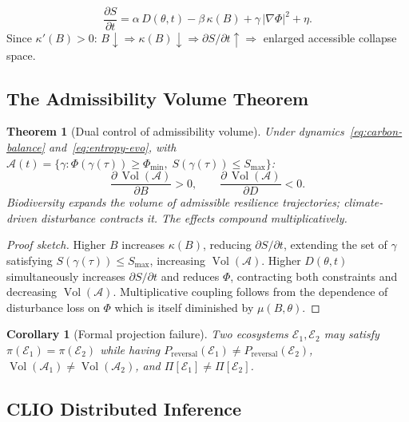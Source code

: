 \documentclass[12pt]{article}
\newtheorem{theorem}{Theorem}
\newtheorem{corollary}{Corollary}
\newcommand{\Ecal}{\mathcal{E}}
\newcommand{\Acal}{\mathcal{A}}
\newcommand{\vol}{\operatorname{Vol}}
\begin{document}
\begin{equation}
\label{eq:entropy-evo}
\frac{\partial S}{\partial t}
= \alpha\,D(\theta,t)
- \beta\,\kappa(B)
+ \gamma\,|\nabla\Phi|^2
+ \eta.
\end{equation}
Since $\kappa'(B)>0$: $B\downarrow \Rightarrow \kappa(B)\downarrow \Rightarrow
\partial S/\partial t\uparrow \Rightarrow$ enlarged accessible collapse space.

\subsection{The Admissibility Volume Theorem}

\begin{theorem}[Dual control of admissibility volume]
Under dynamics~\eqref{eq:carbon-balance} and~\eqref{eq:entropy-evo}, with
$\Acal(t)=\{\gamma:\Phi(\gamma(\tau))\geq\Phi_{\min},\;S(\gamma(\tau))\leq S_{\max}\}$:
\begin{equation}
\frac{\partial\,\vol(\Acal)}{\partial B}>0,
\qquad
\frac{\partial\,\vol(\Acal)}{\partial D}<0.
\end{equation}
Biodiversity expands the volume of admissible resilience trajectories; climate-driven
disturbance contracts it. The effects compound multiplicatively.
\end{theorem}

\begin{proof}[Proof sketch]
Higher $B$ increases $\kappa(B)$, reducing $\partial S/\partial t$, extending the set
of $\gamma$ satisfying $S(\gamma(\tau))\leq S_{\max}$, increasing $\vol(\Acal)$.
Higher $D(\theta,t)$ simultaneously increases $\partial S/\partial t$ and reduces $\Phi$,
contracting both constraints and decreasing $\vol(\Acal)$. Multiplicative coupling
follows from the dependence of disturbance loss on $\Phi$ which is itself diminished by
$\mu(B,\theta)$.
\end{proof}

\begin{corollary}[Formal projection failure]
Two ecosystems $\Ecal_1,\Ecal_2$ may satisfy $\pi(\Ecal_1)=\pi(\Ecal_2)$ while having
$P_\text{reversal}(\Ecal_1)\neq P_\text{reversal}(\Ecal_2)$,
$\vol(\Acal_1)\neq\vol(\Acal_2)$, and
$\Pi[\Ecal_1]\neq\Pi[\Ecal_2]$.
\end{corollary}

\subsection{CLIO Distributed Inference}
\end{document}
